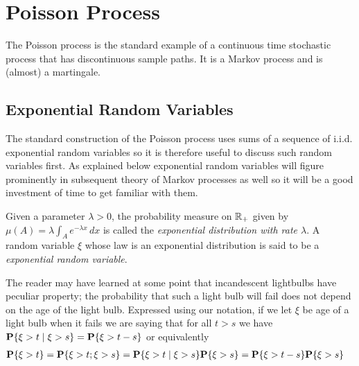 \section{Poisson Process}
The Poisson process is the standard example of a continuous time
stochastic process that has discontinuous sample paths.  It is a
Markov process and is (almost) a martingale.  

\subsection{Exponential Random Variables}
The standard construction of the Poisson process uses sums of a sequence of
i.i.d. exponential random variables so it is therefore useful to
discuss such random variables first.  As explained below exponential
random variables will figure prominently in subsequent theory of
Markov processes as well so it will be a good investment of time to
get familiar with them.

\begin{defn}Given a parameter $\lambda > 0$, the probability measure
  on $\reals_+$ given by $\mu(A) = \lambda \int_A e^{-\lambda x} \,
  dx$ is called the \emph{exponential distribution with rate
    $\lambda$}.  A random variable $\xi$ whose law is an exponential
  distribution is said to be a \emph{exponential random variable}.
\end{defn}

The reader may have learned at some point that incandescent lightbulbs
have peculiar property; the probability that such a light bulb will
fail does not depend on the age of the light bulb.  Expressed using
our notation, if we let $\xi$ be age of a light bulb when it fails we
are saying that for all $t > s$ we have $\cprobability{\xi > s}{\xi >
  t} = \probability{\xi > t -s}$ or equivalently 
\begin{align*}
\probability{\xi > t} &= \probability{\xi > t ; \xi > s} = \cprobability{\xi > s}{\xi >
  t} \probability{\xi > s}= \probability{\xi > t -s}\probability{\xi > s}
\end{align*}

